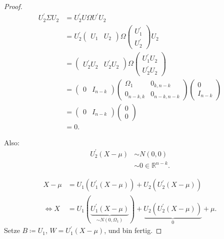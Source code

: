 \documentclass{tstextbook}
\newcommand{\R}{\mathbb R}
\begin{document}
\begin{proof}
	\[
	\begin{aligned}
		U_2^\prime \Sigma U_2 & = U_2^\prime U \Omega U^\prime U_2 \\
		& = U_2^\prime \begin{pmatrix}
			U_1 & U_2
		\end{pmatrix} \Omega \begin{pmatrix}
			U_1^\prime\\
			U_2^\prime
		\end{pmatrix} U_2 \\
		& = \begin{pmatrix}
			U_2^\prime U_2 & U_2^\prime U_2
		\end{pmatrix} \Omega \begin{pmatrix}
			U_1^\prime U_2\\
			U_2^\prime U_2
		\end{pmatrix} \\
		& = \begin{pmatrix}
			0 & I_{n-k}
		\end{pmatrix}  
		\begin{pmatrix}
			\Omega_1 		& 0_{k,n-k} \\
			0_{n-k,k}		& 0_{n-k,n-k}
		\end{pmatrix} 
		\begin{pmatrix}
			0\\
			I_{n-k}
		\end{pmatrix} \\
		& = \begin{pmatrix}
			0 & I_{n-k}
		\end{pmatrix}  
		\begin{pmatrix}
			0  \\
			0
		\end{pmatrix} \\
		& = 0 .
	\end{aligned}
	\]
	
	Also: \[ \begin{aligned} U_2^\prime (X-\mu) & \sim N(0,0) \\
		& \sim 0 \in \R^{n-k}. \end{aligned} \]
	
	\[
	\begin{aligned}
		X-\mu & = U_1\left(U_1^\prime (X-\mu)\right) + U_2 \left(U_2^\prime (X-\mu)\right) \\
		\Leftrightarrow X & = U_1(\underbrace{U_1^\prime (X-\mu)}_{\sim N(0,\Omega_1)}) + \underbrace{U_2 \left(U_2^\prime (X-\mu)\right)}_{0} + \mu.
	\end{aligned}
	\]
	Setze $ B \coloneqq U_1 $, $ W = U_1^\prime (X-\mu) $, und bin fertig.
\end{proof}
\end{document}
